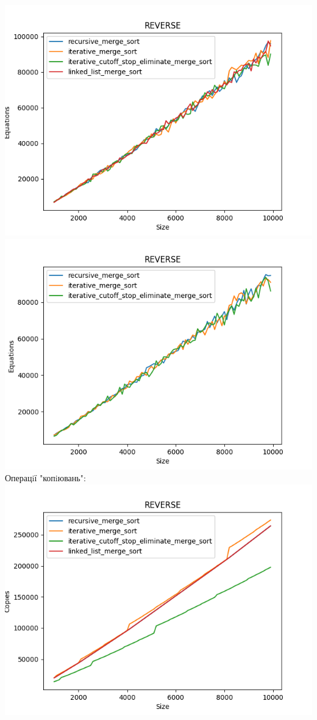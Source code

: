 \documentclass{article}
\begin{document}
            \includegraphics[scale=0.5]{reverse_Equations_4_sorts_90_numbers_50.png}
            \includegraphics[scale=0.5]{reverse_Equations_3_sorts_90_numbers_50.png}
        \newpage
        Операцiї "копiювань":
        \newline
            \includegraphics[scale=0.5]{reverse_Copies_4_sorts_90_numbers_50.png}
\end{document}
